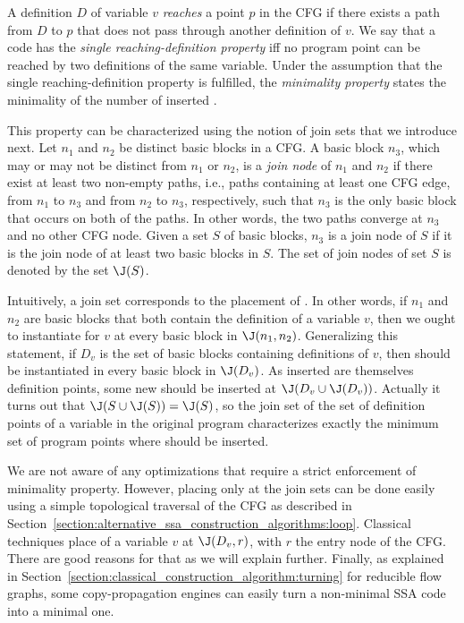 A definition $D$ of variable $v$ \emph{reaches} a point $p$ in the CFG
if there exists a path from $D$ to $p$ that does not pass through another
definition of $v$. We say that a code has the \emph{single reaching-definition property} iff no program point can be reached by two definitions of the same variable. 
Under the assumption that the single reaching-definition property is fulfilled, the \emph{minimality property} states the minimality of the number of inserted \phifuns.

This property can be characterized using the notion of join sets that we introduce next.
Let $n_{1}$ and $n_{2}$ be distinct basic blocks in a CFG. A basic block
$n_{3}$, which may or may not be distinct from $n_{1}$ or $n_{2}$, is 
a \emph{join node} of $n_{1}$ and $n_{2}$ if there exist at least two
non-empty paths, i.e., paths containing at least one CFG edge, from 
$n_{1}$ to $n_{3}$ and from $n_{2}$ to $n_{3}$, respectively, such that
$n_{3}$ is the only basic block that occurs on both of the paths. In
other words, the two paths converge at $n_{3}$ and no other CFG node. 
Given a set $S$ of basic blocks, $n_{3}$ is a join node of $S$ if it
is the join node of at least two basic blocks in $S$. The set of join
nodes of set $S$ is denoted by the set $\J(S)$. 

Intuitively, a join set corresponds to the placement of \phifuns.
In other words, if $n_{1}$ and $n_{2}$ are basic blocks that both
contain the definition of a variable $v$, then we ought to instantiate
\phifuns for $v$ at every basic block in $\J(n_{1}, n_{2})$. 
Generalizing this statement, if $D_v$ is the set of basic blocks containing
definitions of $v$, then \phifuns should be instantiated in
every basic block in $\J(D_v)$. As inserted \phifuns are themselves 
definition points, some new \phifuns should be inserted at $\J(D_v\cup\J(D_v))$. 
Actually it turns out that $\J(S\cup\J(S))=\J(S)$, so the join set of the set of definition points of a variable in the original program characterizes exactly the minimum set of program points where \phifuns should be inserted.

We are not aware of any optimizations that require a strict enforcement of minimality property.
However, placing \phifuns only at the join sets can be done easily using a simple topological traversal of the CFG as described in Section~\ref{section:alternative_ssa_construction_algorithms:loop}. Classical techniques place \phifuns of a variable $v$ at $\J(D_v,r)$, with $r$ the entry node of the CFG. There are good reasons for that as we will explain further. Finally, as explained in Section~\ref{section:classical_construction_algorithm:turning} for reducible flow graphs, some copy-propagation engines can easily turn a non-minimal SSA code into a minimal one.

